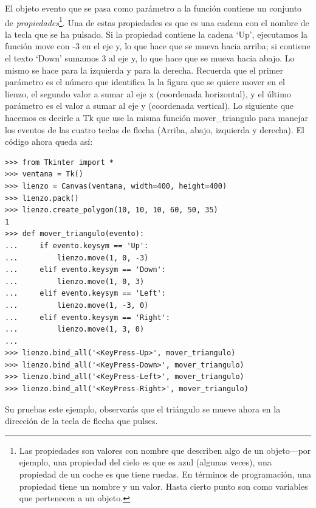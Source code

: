 El objeto evento que se pasa como parámetro a la función contiene un conjunto de \emph{propiedades}\footnote{Las propiedades son valores con nombre que describen algo de un objeto---por ejemplo, una propiedad del cielo es que es azul (algunas veces), una propiedad de un coche es que tiene ruedas. En términos de programación, una propiedad tiene un nombre y un valor. Hasta cierto punto son como variables que pertenecen a un objeto.}. Una de estas propiedades es  que es una cadena con el nombre de la tecla que se ha pulsado.  Si la propiedad contiene la cadena `Up', ejecutamos la función move con -3 en el eje y, lo que hace que se mueva hacia arriba; si contiene el texto `Down' sumamos 3 al eje y, lo que hace que se mueva hacia abajo. Lo mismo se hace para la izquierda y para la derecha.  Recuerda que el primer parámetro es el número que identifica la la figura que se quiere mover en el lienzo, el segundo valor a sumar al eje x (coordenada horizontal), y el último parámetro es el valor a sumar al eje y (coordenada vertical).  Lo siguiente que hacemos es decirle a Tk que use la misma función mover\_triangulo para manejar los eventos de las cuatro teclas de flecha (Arriba, abajo, izquierda y derecha). El código ahora queda así:

\begin{listingignore}
\begin{verbatim}
>>> from Tkinter import *
>>> ventana = Tk()
>>> lienzo = Canvas(ventana, width=400, height=400)
>>> lienzo.pack()
>>> lienzo.create_polygon(10, 10, 10, 60, 50, 35)
1
>>> def mover_triangulo(evento):
...     if evento.keysym == 'Up':
...         lienzo.move(1, 0, -3)
...     elif evento.keysym == 'Down':
...         lienzo.move(1, 0, 3)
...     elif evento.keysym == 'Left':
...         lienzo.move(1, -3, 0)
...     elif evento.keysym == 'Right':
...         lienzo.move(1, 3, 0)
...
>>> lienzo.bind_all('<KeyPress-Up>', mover_triangulo)
>>> lienzo.bind_all('<KeyPress-Down>', mover_triangulo)
>>> lienzo.bind_all('<KeyPress-Left>', mover_triangulo)
>>> lienzo.bind_all('<KeyPress-Right>', mover_triangulo)
\end{verbatim}
\end{listingignore}

\noindent
Su pruebas este ejemplo, observarás que el triángulo se mueve ahora en la dirección de la tecla de flecha que pulses.

\newpage
